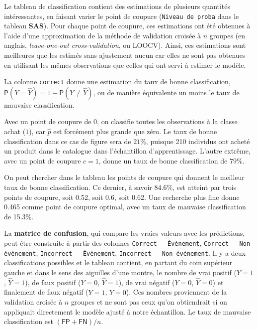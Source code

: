 \documentclass[
  11pt,
  letterpaper,
]{book}
\theoremstyle{definition}
\theoremstyle{definition}
\theoremstyle{definition}
\theoremstyle{definition}
\theoremstyle{remark}
\begin{document}
Le tableau de classification contient des estimations de plusieurs quantités intéressantes, en faisant varier le point de coupure (\texttt{Niveau\ de\ proba} dans le tableau \textbf{SAS}). Pour chaque point de coupure, ces estimations ont été obtenues à l'aide d'une approximation de la méthode de validation croisée à \(n\) groupes (en anglais, \emph{leave-one-out cross-validation}, ou LOOCV). Ainsi, ces estimations sont meilleures que les estimés sans ajustement aucun car elles ne sont pas obtenues en utilisant les mêmes observations que celles qui ont servi à estimer le modèle.

La colonne \texttt{correct} donne une estimation du taux de bonne classification, \({\mathsf P}\left(Y = \widehat{Y}\right) = 1-{\mathsf P}\left(Y \neq \widehat{Y}\right)\), ou de manière équivalente un moins le taux de mauvaise classification.

Avec un point de coupure de \(0\), on classifie toutes les observations à la classe achat (\(1\)), car \(\widehat{p}\) est forcément plus grande que zéro. Le taux de bonne classification dans ce cas de figure sera de \(21\)\%, puisque 210 individus ont acheté un produit dans le catalogue dans l'échantillon d'apprentissage.
L'autre extrême, avec un point de coupure \(c=1\), donne un taux de bonne classification de \(79\)\%.

On peut chercher dans le tableau les points de coupure qui donnent le meilleur taux de bonne classification. Ce dernier, à savoir 84.6\%, est atteint par trois points de coupure, soit 0.52, soit 0.6, soit 0.62. Une recherche plus fine donne 0.465 comme point de coupure optimal, avec un taux de mauvaise classification de 15.3\%.

La \textbf{matrice de confusion}, qui compare les vraies valeurs avec les prédictions, peut être construite à partir des colonnes \texttt{Correct\ -\ Événement}, \texttt{Correct\ -\ Non-événement}, \texttt{Incorrect\ -\ Événement}, \texttt{Incorrect\ -\ Non-événement}. Il y a deux classifications possibles et le tableau contient, en partant du coin supérieur gauche et dans le sens des aiguilles d'une montre, le nombre de vrai positif (\(Y=1\), \(\widehat{Y}=1\)), de faux positif (\(Y=0\), \(\widehat{Y}=1\)), de vrai négatif (\(Y=0\), \(\widehat{Y}=0\)) et finalement de faux négatif (\(Y=1\), \(\widehat{Y}=0\)). Ces nombres proviennent de la validation croisée à \(n\) groupes et ne sont pas ceux qu'on obtiendrait si on appliquait directement le modèle ajusté à notre échantillon. Le taux de mauvaise classification est \((\mathsf{FP}+\mathsf{FN})/n\).
\end{document}
